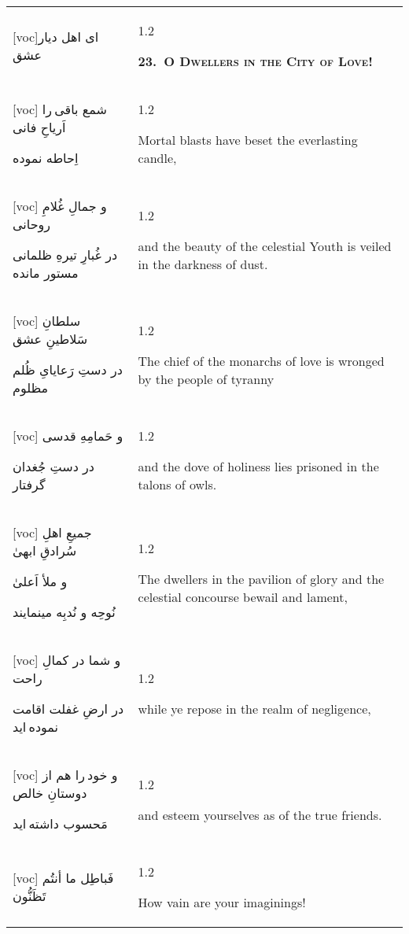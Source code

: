 \documentclass[11pt]{article}
\makeatletter
\newenvironment{orig}
  {\begin{farsi}[voc]}
  {\end{farsi}}
\newenvironment{trans}
  {\Large\begin{spacing}{1.2}\raggedright}
  {\end{spacing}}
\newenvironment{word}
  {\begin{tabular}[t]{p{2.75in}@{\hspace{3em}}p{2.875in}}}
  {\end{tabular}}
\newcommand{\ayat}[2]{\begin{orig}#1\end{orig} & \begin{trans}#2\end{trans}}
\newcommand{\heading}[2]{\textsc{\textbf{#1}} %
}
\makeatother
\begin{document}
\begin{word}
\ayat{ای اهل ديار عشق}{\heading{23.~O Dwellers in the City of Love!}{}} \vspace{-1ex}\\ \ayat{
شمع باقی را اَرياحِ فانی

اِحاطه نموده
}{Mortal blasts have beset the everlasting candle,} \vspace{-1ex}\\ \ayat{
و جمالِ غُلامِ روحانی

در غُبارِ تيرهِ ظلمانی مستور مانده
}{and the beauty of the celestial Youth is veiled in the darkness of
  dust.} \vspace{-1ex}\\ \ayat{
سلطانِ سَلاطينِ عشق

در دستِ رَعايایِ ظُلم مظلوم
}{The chief of the monarchs of love is wronged by the people of
  tyranny} \vspace{-1ex}\\ \ayat{
و حَمامِهِ قدسی

در دستِ جُغدان گرفتار
}{and the dove of holiness lies prisoned in the talons of owls.} \vspace{-1ex}\\ \ayat{
جميعِ اهلِ سُرادقِ ابهیٰ

و ملأ اَعلیٰ

نُوحِه و نُدبِه مينمايند
}{The dwellers in the pavilion of glory and the celestial concourse bewail and
  lament,} \\ \ayat{
و شما در کمالِ راحت

در ارضِ غفلت اقامت نموده ايد
}{while ye repose in the realm of negligence,} \vspace{-1ex}\\ \ayat{
و خود را هم از دوستانِ خالص

مَحسوب داشته ايد
}{and esteem yourselves as of the true friends.} \vspace{-1ex}\\ \ayat{
فَباطِل ما أنتُم تَظَنُّون
}{How vain are your imaginings!}
\end{word}

\pagebreak
\end{document}
